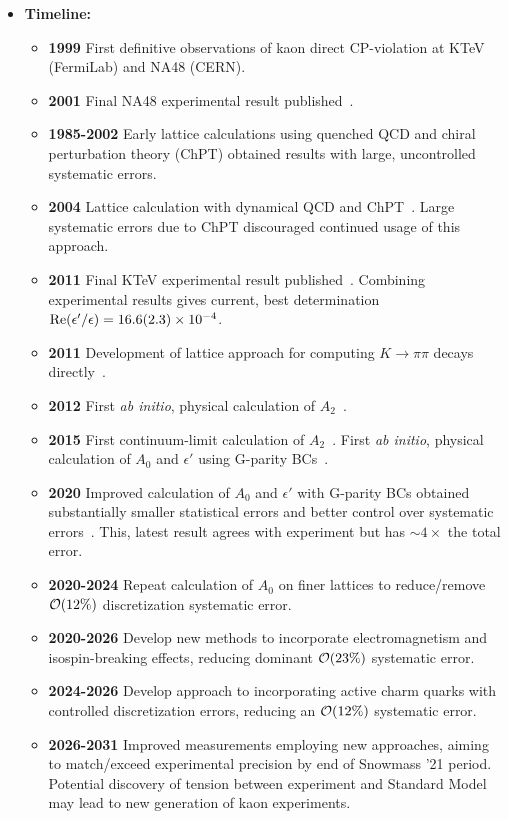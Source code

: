 \documentclass[12pt,hyperpdf]{article}
\begin{document}
\begin{itemize}
\item{\bf Timeline:}
\begin{itemize}
    \item{\bf 1999} First definitive observations of kaon direct CP-violation at KTeV (FermiLab) and NA48 (CERN).
    \item{\bf 2001} Final NA48 experimental result published~\cite{NA48:2001bct}.
    \item{\bf 1985-2002} Early lattice calculations using quenched QCD and chiral perturbation theory (ChPT) obtained results with large, uncontrolled systematic errors.
    \item{\bf 2004} Lattice calculation with dynamical QCD and ChPT~\cite{Li:2008kc}. Large systematic errors due to ChPT discouraged continued usage of this approach.
    \item{\bf 2011} Final KTeV experimental result published~\cite{KTeV:2010sng}. Combining experimental results gives current, best determination ${\rm Re}(\epsilon'/\epsilon)=16.6(2.3)\times 10^{-4}$.
    \item{\bf 2011} Development of lattice approach for computing $K\to\pi\pi$ decays directly~\cite{Blum:2011pu}.
    \item{\bf 2012} First {\it ab initio}, physical calculation of $A_2$~\cite{Blum:2011ng,Blum:2012uk}.
    \item{\bf 2015} First continuum-limit calculation of $A_2$~\cite{Blum:2015ywa}. First {\it ab initio}, physical calculation of $A_0$ and $\epsilon'$ using G-parity BCs~\cite{RBC:2015gro}.
    \item{\bf 2020} Improved calculation of $A_0$ and $\epsilon'$ with G-parity BCs obtained substantially smaller statistical errors and better control over systematic errors~\cite{RBC:2020kdj}. This, latest result agrees with experiment but has ${\sim}4\times$ the total error.
    \item{\bf 2020-2024} Repeat calculation of $A_0$ on finer lattices to reduce/remove ${\cal O}(12\%)$ discretization systematic error.
    \item{\bf 2020-2026} Develop new methods to incorporate electromagnetism and isospin-breaking effects, reducing dominant ${\cal O}(23\%)$ systematic error.
    \item{\bf 2024-2026} Develop approach to incorporating active charm quarks with controlled discretization errors, reducing an ${\cal O}(12\%)$ systematic error.
    \item{\bf 2026-2031} Improved measurements employing new approaches, aiming to match/exceed experimental precision by end of Snowmass '21 period. Potential discovery of tension between experiment and Standard Model may lead to new generation of kaon experiments.
\end{itemize}
\end{itemize}
\end{document}
